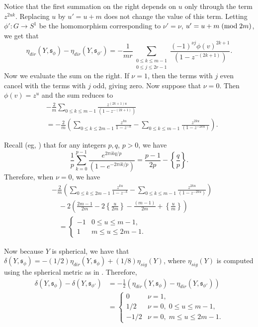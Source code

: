 \documentclass{amsart}
\theoremstyle{definition}
\theoremstyle{remark}
\numberwithin{equation}{section}
\begin{document}
Notice that the first summation on the right depends on $u$ only through the term $z^{2uk}$. Replacing $u$ by $u' = u + m$ does not change the value of this term. Letting $\phi' : G \to S^1$ be the homomorphism corresponding to $\nu' = \nu$, $u' = u + m \; ({\rm mod} \; 2m)$, we get that
\[
\eta_{dir}(Y , \mathfrak{s}_\phi) - \eta_{dir}(Y , \mathfrak{s}_{\phi'}) = - \frac{1}{mr} \sum_{\substack{0 \le k \le m-1 \\ 0 \le j \le 2r-1}} \frac{ (-1)^{\nu j} \phi(v)^{2k+1} }{(1-z^{-(2k+1)})}.
\]
Now we evaluate the sum on the right. If $\nu = 1$, then the terms with $j$ even cancel with the terms with $j$ odd, giving zero. Now suppose that $\nu = 0$. Then $\phi(v) = z^u$ and the sum reduces to
\begin{align*}
& -\frac{2}{m} \sum_{0 \le k \le m-1} \frac{ z^{(2k+1)u} }{(1-z^{-(2k+1)})} \\
& = -\frac{2}{m} \left( \sum_{0 \le k \le 2m-1} \frac{ z^{ku} }{1-z^{-k}} - \sum_{0\le k \le m-1} \frac{ z^{2ku} }{(1-z^{-2ku}) } \right).
\end{align*}

Recall (eg, \cite[Lemma 2.1]{bar}) that for any integers $p,q$, $p > 0$, we have
\[
\frac{1}{p} \sum_{k=0}^{p-1} \frac{ e^{2\pi i kq/p} }{ (1- e^{-2\pi ik/p}) } = \frac{p-1}{2p} - \left\{ \frac{q}{p} \right\}. 
\]
Therefore, when $\nu = 0$, we have
\begin{align*}
& -\frac{2}{m} \left( \sum_{0 \le k \le 2m-1} \frac{ z^{ku} }{1-z^{-k}} - \sum_{0\le k \le m-1} \frac{ z^{2ku} }{(1-z^{-2ku}) } \right) \\
& \quad -2 \left( \frac{2m-1}{2m} - 2\left\{ \frac{u}{2m} \right\} - \frac{(m-1)}{2m} + \left \{ \frac{u}{m} \right\} \right) \\
& \quad = \begin{cases} -1 & 0 \le u \le m-1, \\ 1 & m \le u \le 2m-1. \end{cases}
\end{align*} 

Now because $Y$ is spherical, we have that $\delta(Y , \mathfrak{s}_\phi) = -(1/2) \eta_{dir}(Y , \mathfrak{s}_\phi) + (1/8)\eta_{sig}(Y)$, where $\eta_{sig}(Y)$ is computed using the spherical metric as in \cite[]{bar}. Therefore,
\begin{align*}
\delta(Y , \mathfrak{s}_\phi) - \delta(Y , \mathfrak{s}_{\phi'}) &= -\frac{1}{2}\left( \eta_{dir}(Y , \mathfrak{s}_\phi) - \eta_{dir}(Y , \mathfrak{s}_{\phi'}) \right) \\
&= \begin{cases} 0 & \nu = 1, \\ 1/2 & \nu = 0, \; 0 \le u \le m-1, \\ -1/2 & \nu = 0, \; m \le u \le 2m-1. \end{cases}
\end{align*}
\end{document}
